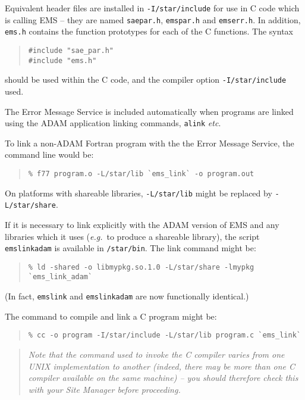 \documentclass[twoside,11pt]{article}
\renewcommand{\_}{\texttt{\symbol{95}}}
\begin{document}
Equivalent header files are installed in \texttt{-I/star/include} for use in C
code which is calling EMS -- they are named \texttt{sae\_par.h},
\texttt{ems\_par.h} and \texttt{ems\_err.h}.
In addition, \texttt{ems.h} contains the function prototypes for each of the C 
functions.
The syntax
\begin{quote}
\begin{verbatim}
#include "sae_par.h"
#include "ems.h"
\end{verbatim}
\end{quote}
should be used within the C code, and the compiler option
\texttt{-I/star/include} used.


The Error Message Service is included automatically when
programs are linked using the ADAM application linking commands,
\texttt{alink} \textit{etc}.

To link a non-ADAM Fortran program with the the Error Message Service, the
command line would be:
\begin {quote}
\begin{verbatim}
% f77 program.o -L/star/lib `ems_link` -o program.out
\end{verbatim}
\end {quote}
On platforms with shareable libraries, \texttt{-L/star/lib} might be replaced 
by \texttt{-L/star/share}.

If it is necessary to link explicitly with the ADAM version of EMS and any
libraries which it uses (\textit{e.g.}\ to produce a shareable library), the 
script \texttt{ems\_link\_adam} is available in \texttt{/star/bin}. 
The link command might be:
\begin {quote}
\begin {small}
\begin{verbatim}
% ld -shared -o libmypkg.so.1.0 -L/star/share -lmypkg `ems_link_adam`
\end{verbatim}
\end {small}
\end {quote}
(In fact, \texttt{ems\_link} and \texttt{ems\_link\_adam} are now functionally
identical.)

The command to compile and link a C program might be:
\begin {quote}
\begin{verbatim}
% cc -o program -I/star/include -L/star/lib program.c `ems_link`
\end{verbatim}
\end {quote}

\begin {quote}
\emph{Note that the command used to invoke the C compiler varies from 
one UNIX implementation to another (indeed, there may be more than one C
compiler available on the same machine) -- you should therefore check this
with your Site Manager before proceeding.}
\end {quote}
\end{document}
